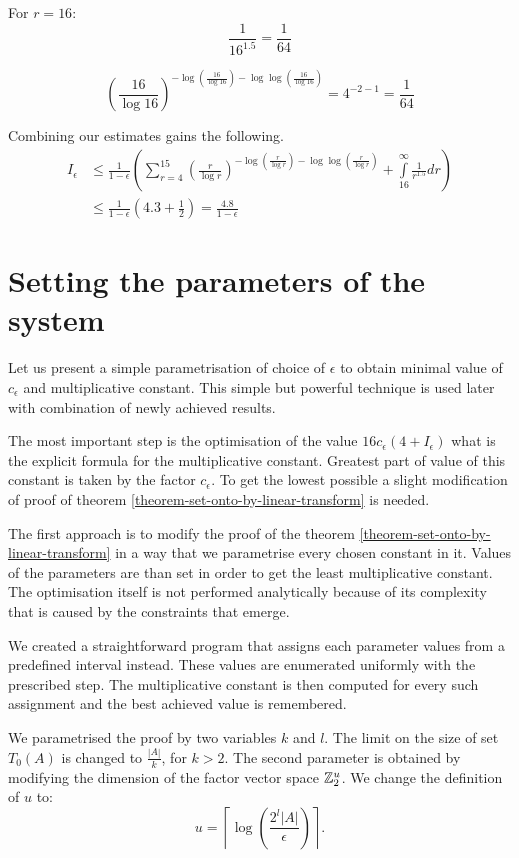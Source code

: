 For $r = 16$:
\[
	\frac{1}{16 ^ {1.5}} = \frac{1}{64}
\]

\[
	\left(\frac{16}{\log 16}\right)^{-\log \left(\frac{16}{\log 16}\right) - \log \log \left(\frac{16}{\log 16}\right)} = 4^{-2 - 1} = \frac{1}{64}
\]

Combining our estimates gains the following.
\[
\begin{split}
I_{\epsilon} 
	& \leq \frac{1}{1 - \epsilon} \left( \displaystyle \sum_{r = 4}^{15} \left(\frac{r}{\log r}\right)^{-\log \left(\frac{r}{\log r}\right) - \log \log \left(\frac{r}{\log r}\right)} + \int\limits_{16}^\infty \frac{1}{r^{1.5}} dr \right) \\
	& \leq \frac{1}{1 - \epsilon} \left(4.3 + \frac{1}{2}\right) = \frac{4.8}{1-\epsilon}
\end{split}
\]

\section{Setting the parameters of the system}
Let us present a simple parametrisation of choice of $\epsilon$ to obtain minimal value of $c_\epsilon$ and multiplicative constant. This simple but powerful technique is used later with combination of newly achieved results.

The most important step is the optimisation of the value $16 c_\epsilon (4 + I_{\epsilon})$ what is the explicit formula for the multiplicative constant. Greatest part of value of this constant is taken by the factor $c_\epsilon$. To get the lowest possible a slight modification of proof of theorem \ref{theorem-set-onto-by-linear-transform} is needed.

The first approach is to modify the proof of the theorem \ref{theorem-set-onto-by-linear-transform} in a way that we parametrise every chosen constant in it. Values of the parameters are than set in order to get the least multiplicative constant. The optimisation itself is not performed analytically because of its complexity that is caused by the constraints that emerge. 

We created a straightforward program that assigns each parameter values from a predefined interval instead. These values are enumerated uniformly with the prescribed step. The multiplicative constant is then computed for every such assignment and the best achieved value is remembered.

We parametrised the proof by two variables $k$ and $l$. The limit on the size of set $T_0(A)$ is changed to $\frac{|A|}{k}$, for $k > 2$. The second parameter is obtained by modifying the dimension of the factor vector space $\mathbb{Z}_{2}^{u}$. We change the definition of $u$ to:
\[
u = \left\lceil \log \left(\frac{2^l |A|}{\epsilon}\right) \right\rceil \text{.}
\]

